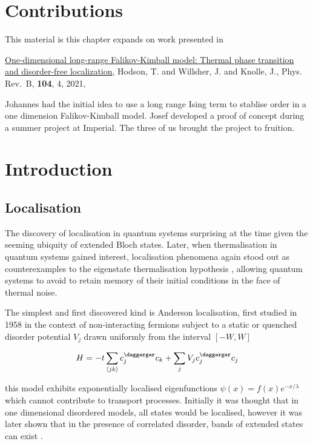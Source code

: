 \hypertarget{contributions}{%
\section{Contributions}\label{contributions}}

This material is this chapter expands on work presented in

\autocite{hodsonOnedimensionalLongRangeFalikovKimball2021} \href{https://link.aps.org/doi/10.1103/PhysRevB.104.045116}{One-dimensional long-range Falikov-Kimball model: Thermal phase transition and disorder-free localization}, Hodson, T. and Willsher, J. and Knolle, J., Phys. Rev.~B, \textbf{104}, 4, 2021,

Johannes had the initial idea to use a long range Ising term to stablise order in a one dimension Falikov-Kimball model. Josef developed a proof of concept during a summer project at Imperial. The three of us brought the project to fruition.

\hypertarget{introduction}{%
\section{Introduction}\label{introduction}}

\hypertarget{localisation}{%
\subsection{Localisation}\label{localisation}}

The discovery of localisation in quantum systems surprising at the time given the seeming ubiquity of extended Bloch states. Later, when thermalisation in quantum systems gained interest, localisation phenomena again stood out as counterexamples to the eigenstate thermalisation hypothesis \autocite{abaninRecentProgressManybody2017,srednickiChaosQuantumThermalization1994}, allowing quantum systems to avoid to retain memory of their initial conditions in the face of thermal noise.

The simplest and first discovered kind is Anderson localisation, first studied in 1958 \textcite{andersonAbsenceDiffusionCertain1958} in the context of non-interacting fermions subject to a static or quenched disorder potential \(V_j\) drawn uniformly from the interval \([-W,W]\)

\[
H = -t\sum_{\langle jk \rangle} c^\daggerger_j c_k + \sum_j V_j c_j^\daggerger c_j
\]

this model exhibits exponentially localised eigenfunctions \(\psi(x) = f(x) e^{-x/\lambda}\) which cannot contribute to transport processes. Initially it was thought that in one dimensional disordered models, all states would be localised, however it was later shown that in the presence of correlated disorder, bands of extended states can exist \autocite{izrailevLocalizationMobilityEdge1999,croyAndersonLocalization1D2011,izrailevAnomalousLocalizationLowDimensional2012}.

